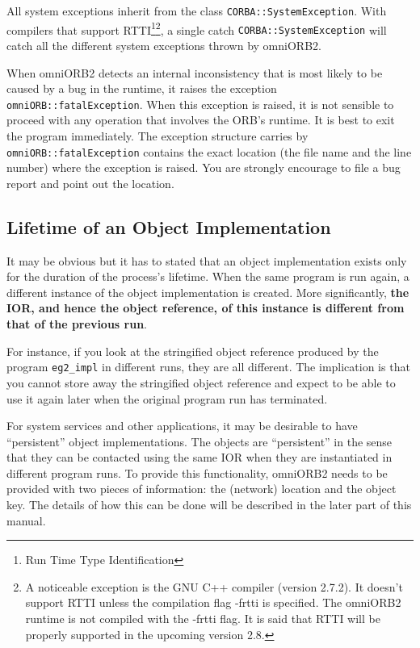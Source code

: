 \documentclass[11pt,twoside,onecolumn]{book}
\begin{document}
All system exceptions inherit from the class
{\tt CORBA::SystemException}. With compilers that support RTTI\footnote{Run Time
Type Identification}\footnote{A noticeable exception is the GNU C++
compiler (version 2.7.2). It doesn't support RTTI unless the
compilation flag -frtti is specified. The omniORB2 runtime is not compiled
with the -frtti flag. It is said that RTTI will be properly supported in
the upcoming version 2.8.}, a single catch {\tt CORBA::SystemException} will
catch all the different system exceptions thrown by omniORB2. 

When omniORB2 detects an internal inconsistency that is most likely to be
caused by a bug in the runtime, it raises the exception {\tt
omniORB::fatalException}.  When this exception is raised, it is not
sensible to proceed with any operation that involves the ORB's runtime. It
is best to exit the program immediately. The exception structure carries by
{\tt omniORB::fatalException} contains the exact location (the file name
and the line number) where the exception is raised. You are strongly
encourage to file a bug report and point out the location.

\subsection{Lifetime of an Object Implementation}

It may be obvious but it has to stated that an object implementation exists
only for the duration of the process's lifetime. When the same program is
run again, a different instance of the object implementation is
created. More significantly, {\bf the IOR, and hence the object reference,
of this instance is different from that of the previous run}.

For instance, if you look at the stringified object reference produced by
the program {\tt eg2\_impl} in different runs, they are all
different. The implication is that you cannot store away the stringified
object reference and expect to be able to use it again later when the
original program run has terminated.

For system services and other applications, it may be desirable to have
``persistent'' object implementations.  The objects are ``persistent'' in
the sense that they can be contacted using the same IOR when they are
instantiated in different program runs. To provide this functionality,
omniORB2 needs to be provided with two pieces of information: the (network)
location and the object key. The details of how this can be done will be
described in the later part of this manual.
\end{document}
